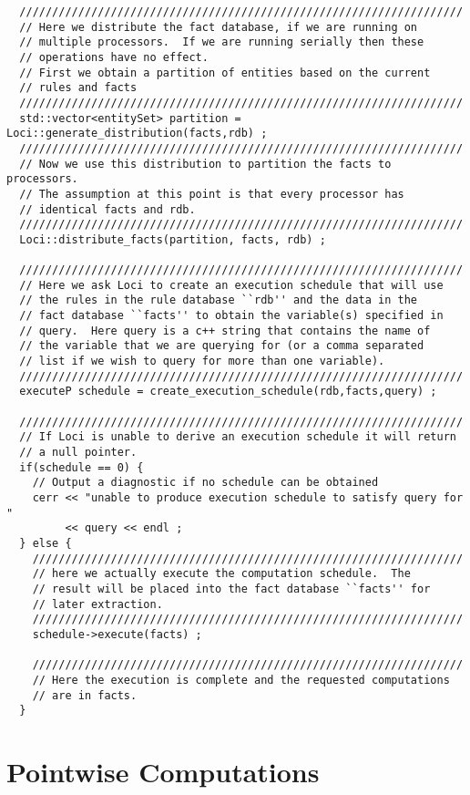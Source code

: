 \documentclass[10pt,epsf]{book}
\begin{document}
\begin{verbatim}
  ////////////////////////////////////////////////////////////////////
  // Here we distribute the fact database, if we are running on
  // multiple processors.  If we are running serially then these
  // operations have no effect.
  // First we obtain a partition of entities based on the current
  // rules and facts
  ////////////////////////////////////////////////////////////////////
  std::vector<entitySet> partition = Loci::generate_distribution(facts,rdb) ;
  ////////////////////////////////////////////////////////////////////
  // Now we use this distribution to partition the facts to processors.
  // The assumption at this point is that every processor has 
  // identical facts and rdb.
  ////////////////////////////////////////////////////////////////////
  Loci::distribute_facts(partition, facts, rdb) ;

  ////////////////////////////////////////////////////////////////////
  // Here we ask Loci to create an execution schedule that will use
  // the rules in the rule database ``rdb'' and the data in the
  // fact database ``facts'' to obtain the variable(s) specified in
  // query.  Here query is a c++ string that contains the name of
  // the variable that we are querying for (or a comma separated
  // list if we wish to query for more than one variable).
  ////////////////////////////////////////////////////////////////////
  executeP schedule = create_execution_schedule(rdb,facts,query) ;

  ////////////////////////////////////////////////////////////////////
  // If Loci is unable to derive an execution schedule it will return
  // a null pointer.
  if(schedule == 0) {
    // Output a diagnostic if no schedule can be obtained
    cerr << "unable to produce execution schedule to satisfy query for "
         << query << endl ;
  } else {
    //////////////////////////////////////////////////////////////////
    // here we actually execute the computation schedule.  The
    // result will be placed into the fact database ``facts'' for
    // later extraction.
    //////////////////////////////////////////////////////////////////
    schedule->execute(facts) ;

    //////////////////////////////////////////////////////////////////
    // Here the execution is complete and the requested computations
    // are in facts.
  }
\end{verbatim}




\section{Pointwise Computations}
\end{document}
